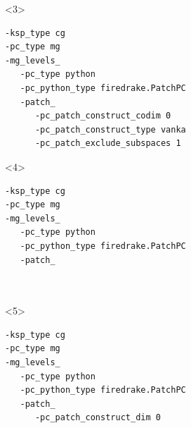 \documentclass[presentation,aspectratio=43,10pt]{beamer}
\begin{document}
\begin{frame}[fragile, t]
\begin{onlyenv}
\begin{columns}
\begin{column}{0.6\textwidth}
\begin{onlyenv}
\begin{verbatim}
\end{verbatim}
        \end{onlyenv}
        \begin{onlyenv}<3>
\begin{verbatim}
-ksp_type cg
-pc_type mg
-mg_levels_
   -pc_type python
   -pc_python_type firedrake.PatchPC
   -patch_
      -pc_patch_construct_codim 0
      -pc_patch_construct_type vanka
      -pc_patch_exclude_subspaces 1
\end{verbatim}
        \end{onlyenv}
        \begin{onlyenv}<4>
\begin{verbatim}
-ksp_type cg
-pc_type mg
-mg_levels_
   -pc_type python
   -pc_python_type firedrake.PatchPC
   -patch_



\end{verbatim}
        \end{onlyenv}
        \begin{onlyenv}<5>
\begin{verbatim}
-ksp_type cg
-pc_type mg
-mg_levels_
   -pc_type python
   -pc_python_type firedrake.PatchPC
   -patch_
      -pc_patch_construct_dim 0



\end{verbatim}
\end{onlyenv}
\end{column}
\end{columns}
\end{onlyenv}
\end{frame}
\end{document}

